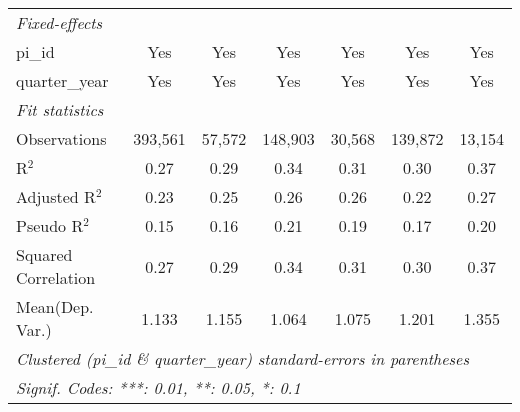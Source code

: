 \begin{tabular}{lcccccc}
   \emph{Fixed-effects}\\
   pi\_id                                                     & Yes            & Yes           & Yes            & Yes           & Yes           & Yes\\  
   quarter\_year                                              & Yes            & Yes           & Yes            & Yes           & Yes           & Yes\\  
   \midrule
   \emph{Fit statistics}\\
   Observations                                               & 393,561        & 57,572        & 148,903        & 30,568        & 139,872       & 13,154\\  
   R$^2$                                                      & 0.27           & 0.29          & 0.34           & 0.31          & 0.30          & 0.37\\  
   Adjusted R$^2$                                             & 0.23           & 0.25          & 0.26           & 0.26          & 0.22          & 0.27\\  
   Pseudo R$^2$                                               & 0.15           & 0.16          & 0.21           & 0.19          & 0.17          & 0.20\\  
   Squared Correlation                                        & 0.27           & 0.29          & 0.34           & 0.31          & 0.30          & 0.37\\  
Mean(Dep. Var.) & 1.133 & 1.155 & 1.064 & 1.075 & 1.201 & 1.355 \\
   \midrule \midrule
   \multicolumn{7}{l}{\emph{Clustered (pi\_id \& quarter\_year) standard-errors in parentheses}}\\
   \multicolumn{7}{l}{\emph{Signif. Codes: ***: 0.01, **: 0.05, *: 0.1}}\\
\end{tabular}
\par\endgroup
